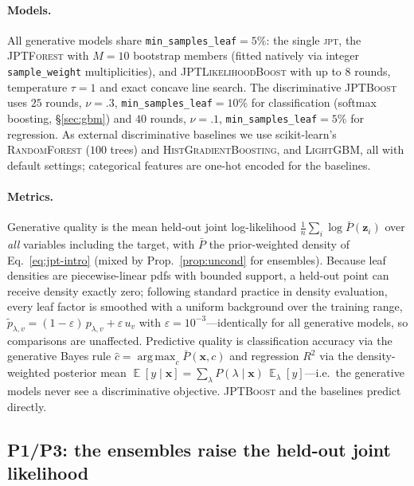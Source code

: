 \documentclass[11pt]{article}
\theoremstyle{plain}
\theoremstyle{definition}
\theoremstyle{remark}
\DeclareMathOperator*{\argmax}{arg\,max}
\DeclareMathOperator{\E}{\mathbb{E}}
\newcommand{\eps}{\varepsilon}
\newcommand{\jpt}{\textsc{jpt}}
\newcommand{\jptforest}{\textsc{JPTForest}}
\newcommand{\likeboost}{\textsc{JPTLikelihoodBoost}}
\newcommand{\jptboost}{\textsc{JPTBoost}}
\begin{document}
\paragraph{Models.} All generative models share
\texttt{min\_samples\_leaf}${}=5\%$: the single \jpt{}, the \jptforest{}
with $M{=}10$ bootstrap members (fitted natively via integer
\texttt{sample\_weight} multiplicities), and \likeboost{} with up to $8$
rounds, temperature $\tau{=}1$ and exact concave line search. The
discriminative \jptboost{} uses $25$ rounds, $\nu{=}.3$,
\texttt{min\_samples\_leaf}${}=10\%$ for classification (softmax
boosting, \S\ref{sec:gbm}) and $40$ rounds, $\nu{=}.1$,
\texttt{min\_samples\_leaf}${}=5\%$ for regression. As external
discriminative baselines we use scikit-learn's
\textsc{RandomForest} ($100$ trees) and
\textsc{HistGradientBoosting}, and \textsc{LightGBM}, all with default
settings; categorical features are one-hot encoded for the baselines.

\paragraph{Metrics.} Generative quality is the mean held-out joint
log-likelihood $\frac1n\sum_i\log \bar P(\mathbf z_i)$ over \emph{all}
variables including the target, with $\bar P$ the prior-weighted density
of Eq.~\eqref{eq:jpt-intro} (mixed by Prop.~\ref{prop:uncond} for
ensembles). Because leaf densities are piecewise-linear pdfs with
bounded support, a held-out point can receive density exactly zero;
following standard practice in density evaluation, every leaf factor is
smoothed with a uniform background over the training range,
$\tilde p_{\lambda,v}=(1-\eps)\,p_{\lambda,v}+\eps\,u_v$ with
$\eps=10^{-3}$---identically for all generative models, so comparisons
are unaffected. Predictive quality is classification accuracy via the
generative Bayes rule $\hat c=\argmax_c \bar P(\mathbf x, c)$ and
regression $R^2$ via the density-weighted posterior mean
$\E[y\mid\mathbf x]=\sum_\lambda P(\lambda\mid\mathbf x)\,
\E_\lambda[y]$---i.e.\ the generative models never see a discriminative
objective. \jptboost{} and the baselines predict directly.

\subsection{P1/P3: the ensembles raise the held-out joint likelihood}
\label{sec:exp-ll}
\end{document}
